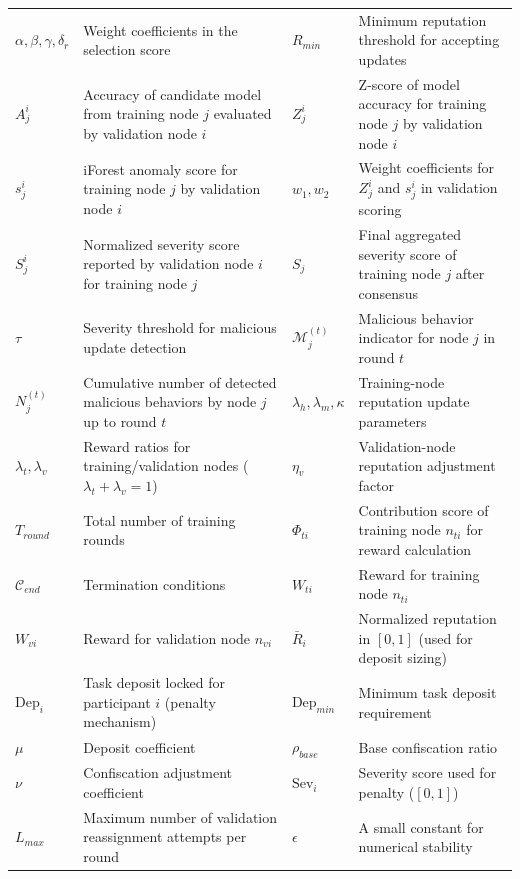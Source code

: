 \documentclass[a4paper]{cas-dc}
\begin{document}
\begin{table}[htbp]
\begin{tabular}{p{} p{}| p{} p{}}
		$\alpha,\beta,\gamma,\delta_r$ & Weight coefficients in the selection score & $R_{min}$ & Minimum reputation threshold for accepting updates \\
		$A_j^i$ & Accuracy of candidate model from training node $j$ evaluated by validation node $i$ & $Z_j^i$ & Z-score of model accuracy for training node $j$ by validation node $i$ \\
		$s_j^i$ & iForest anomaly score for training node $j$ by validation node $i$ & $w_1,w_2$ & Weight coefficients for $Z_j^i$ and $s_j^i$ in validation scoring \\
		$S_j^i$ & Normalized severity score reported by validation node $i$ for training node $j$ & $S_j$ & Final aggregated severity score of training node $j$ after consensus \\
		$\tau$ & Severity threshold for malicious update detection & $\mathcal{M}_j^{(t)}$ & Malicious behavior indicator for node $j$ in round $t$ \\
		$N_j^{(t)}$ & Cumulative number of detected malicious behaviors by node $j$ up to round $t$ & $\lambda_h,\lambda_m,\kappa$ & Training-node reputation update parameters \\
		$\lambda_t,\lambda_v$ & Reward ratios for training/validation nodes ($\lambda_t+\lambda_v=1$) & $\eta_v$ & Validation-node reputation adjustment factor \\
		$T_{round}$ & Total number of training rounds & $\Phi_{ti}$ & Contribution score of training node $n_{ti}$ for reward calculation \\
		$\mathcal{C}_{end}$ & Termination conditions & $W_{ti}$ & Reward for training node $n_{ti}$ \\
		$W_{vi}$ & Reward for validation node $n_{vi}$ & $\bar{R}_i$ & Normalized reputation in $[0,1]$ (used for deposit sizing) \\
		$\mathrm{Dep}_i$ & Task deposit locked for participant $i$ (penalty mechanism) & $\mathrm{Dep}_{min}$ & Minimum task deposit requirement \\
		$\mu$ & Deposit coefficient & $\rho_{base}$ & Base confiscation ratio \\
		$\nu$ & Confiscation adjustment coefficient & $\mathrm{Sev}_i$ & Severity score used for penalty ($[0,1]$) \\
		$L_{max}$ & Maximum number of validation reassignment attempts per round & $\epsilon$ & A small constant for numerical stability \\
        \bottomrule
	\end{tabular}
\end{table}
\end{document}
